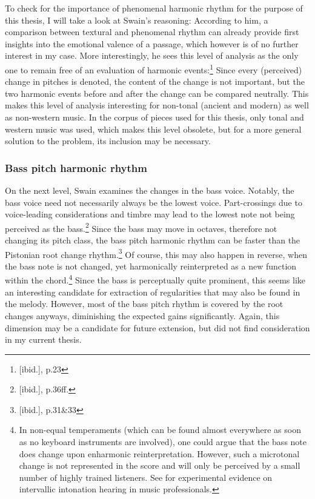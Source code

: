 \documentclass[a4paper,12pt]{report}
\begin{document}
To check for the importance of phenomenal harmonic rhythm for the purpose of this thesis, I will take a look at Swain's reasoning: According to him, a comparison between textural and phenomenal rhythm can already provide first insights into the emotional valence of a passage, which however is of no further interest in my case. More interestingly, he sees this level of analysis as the only one to remain free of an evaluation of harmonic events:\footnote{[ibid.], p.23} Since every (perceived) change in pitches is denoted, the content of the change is not important, but the two harmonic events before and after the change can be compared neutrally. This makes this level of analysis interesting for non-tonal (ancient and modern) as well as non-western music. In the corpus of pieces used for this thesis, only tonal and western music was used, which makes this level obsolete, but for a more general solution to the problem, its inclusion may be necessary.

\subsubsection{Bass pitch harmonic rhythm}
On the next level, Swain examines the changes in the bass voice. Notably, the bass voice need not necessarily always be the lowest voice. Part-crossings due to voice-leading considerations and timbre may lead to the lowest note not being perceived as the bass.\footnote{[ibid.], p.36ff.} Since the bass may move in octaves, therefore not changing its pitch class, the bass pitch harmonic rhythm can be faster than the Pistonian root change rhythm.\footnote{[ibid.], p.31\&33} Of course, this may also happen in reverse, when the bass note is not changed, yet harmonically reinterpreted as a new function within the chord.\footnote{In non-equal temperaments (which can be found almost everywhere as soon as no keyboard instruments are involved), one could argue that the bass note does change upon enharmonic reinterpretation. However, such a microtonal change is not represented in the score and will only be perceived by a small number of highly trained listeners. See \cite{szende1977intervallic} for experimental evidence on intervallic intonation hearing in music professionals.} Since the bass is perceptually quite prominent, this seems like an interesting candidate for extraction of regularities that may also be found in the melody. However, most of the bass pitch rhythm is covered by the root changes anyways, diminishing the expected gains significantly. Again, this dimension may be a candidate for future extension, but did not find consideration in my current thesis.
\end{document}
